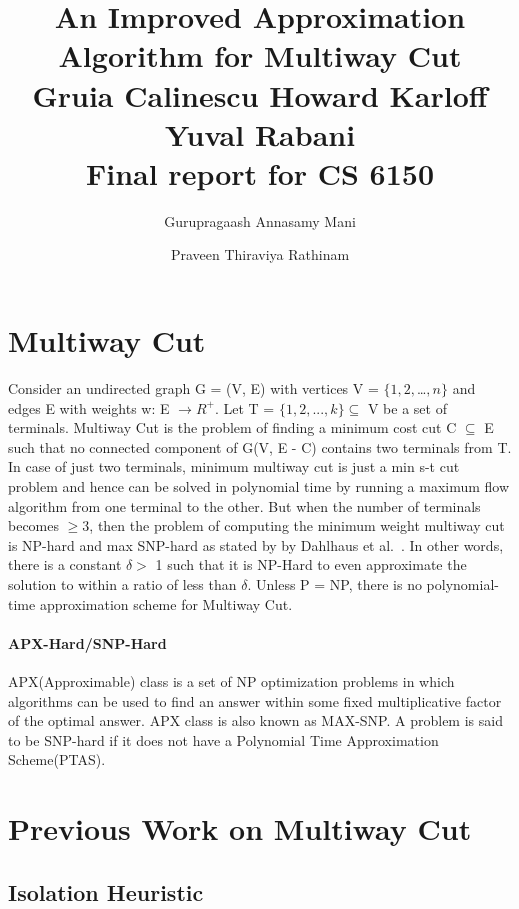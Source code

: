 \documentclass[11pt]{article}
\title{An Improved Approximation Algorithm for Multiway Cut\\Gruia Calinescu Howard Karloﬀ Yuval Rabani\\Final report for CS 6150}
\author{Gurupragaash Annasamy Mani \and Praveen Thiraviya Rathinam}
\begin{document}
\maketitle

\section{Multiway Cut}

Consider an undirected graph G = (V, E) with vertices V = $\{1, 2, $\dots$, n\}$ and edges E with weights w: E $\rightarrow R^{+}$. Let T = $\{1, 2, . . . , k\} \subseteq$ V be a set of terminals. Multiway Cut is the problem of finding a minimum cost cut C $\subseteq$ E such that no connected component of G(V, E - C) contains two terminals from T. In case of just two terminals, minimum multiway cut is just a min s-t cut problem and hence can be solved in polynomial time by running a maximum flow algorithm from one terminal to the other. But when the number of terminals becomes $\ge 3$, then the problem of computing the minimum weight multiway cut is NP-hard and max SNP-hard as stated by by Dahlhaus et al.~\cite{dahlhaus}. In other words, there is a constant $\delta >$ 1 such that it is NP-Hard to even approximate the solution to within a ratio of less than $\delta$. Unless P = NP, there is no polynomial-time approximation scheme for Multiway Cut.
\paragraph{APX-Hard/SNP-Hard}
APX(Approximable) class is a set of NP optimization problems in which algorithms can be used to find an answer within some fixed multiplicative factor of the optimal answer. APX class is also known as MAX-SNP. A problem is said to be SNP-hard if it does not have a Polynomial Time Approximation Scheme(PTAS).
 
\section{Previous Work on Multiway Cut} 
\subsection{Isolation Heuristic}
\end{document}
